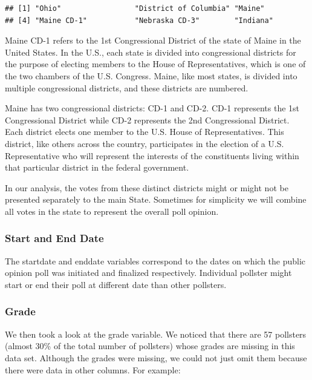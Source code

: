 \documentclass[
  12pt,
]{article}
\begin{document}
\begin{verbatim}
## [1] "Ohio"                 "District of Columbia" "Maine"               
## [4] "Maine CD-1"           "Nebraska CD-3"        "Indiana"
\end{verbatim}

Maine CD-1 refers to the 1st Congressional District of the state of
Maine in the United States. In the U.S., each state is divided into
congressional districts for the purpose of electing members to the House
of Representatives, which is one of the two chambers of the U.S.
Congress. Maine, like most states, is divided into multiple
congressional districts, and these districts are numbered.

Maine has two congressional districts: CD-1 and CD-2. CD-1 represents
the 1st Congressional District while CD-2 represents the 2nd
Congressional District. Each district elects one member to the U.S.
House of Representatives. This district, like others across the country,
participates in the election of a U.S. Representative who will represent
the interests of the constituents living within that particular district
in the federal government.

In our analysis, the votes from these distinct districts might or might
not be presented separately to the main State. Sometimes for simplicity
we will combine all votes in the state to represent the overall poll
opinion.

\hypertarget{start-and-end-date}{%
\subsubsection{Start and End Date}\label{start-and-end-date}}

The startdate and enddate variables correspond to the dates on which the
public opinion poll was initiated and finalized respectively. Individual
pollster might start or end their poll at different date than other
pollsters.

\hypertarget{grade}{%
\subsubsection{Grade}\label{grade}}

We then took a look at the grade variable. We noticed that there are 57
pollsters (almost 30\% of the total number of pollsters) whose grades
are missing in this data set. Although the grades were missing, we could
not just omit them because there were data in other columns. For
example:
\end{document}
